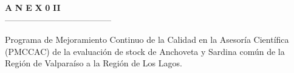 \documentclass[12pt, oneside]{article} %
\begin{document}

\begingroup
\begin{titlepage}
   \normalsize
\vspace*{7cm} 

\noindent


 \begin{flushright}
 \fontsize{35pt}{35pt}\selectfont 	
 \uppercase\expandafter{}  \textbf{A} \hspace{0.2pt} \textbf{N}  \hspace{0.2pt} \textbf{E} \hspace{0.2pt}  \textbf{X} \hspace{0.2pt}   \textbf{0} \hspace{8.5pt}    \textbf{II}  \\
 \vspace*{-0.5cm} 
 --------------------------------------\\
\end{flushright} 

\vspace*{-1.5cm} 

 \begin{flushright}
  \fontsize{14pt}{14pt}\selectfont 
Programa de Mejoramiento Continuo de la Calidad en la Asesoría Científica (PMCCAC) de la evaluación de stock de Anchoveta y Sardina común de la Región de Valparaíso a la Región de Los Lagos.
 \end{flushright} 
      
\end{titlepage}
\endgroup
\end{document}
